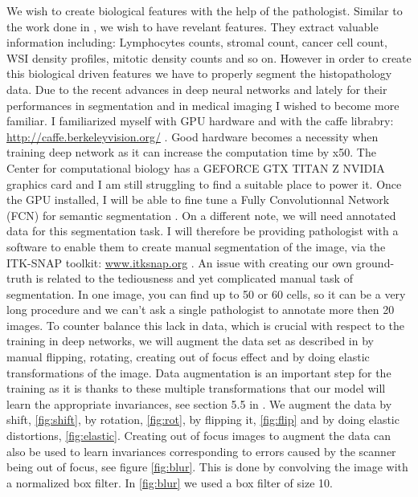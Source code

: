\documentclass[a4paper,10pt]{article}
\begin{document}
We wish to create biological features with the help of the pathologist. Similar to the work done in \citet{yuan2012quantitative}, we wish to have revelant features. They extract valuable information including: Lymphocytes counts, stromal count, cancer cell count, WSI density profiles, mitotic density counts and so on. However in order to create this biological driven features we have to properly segment the histopathology data. Due to the recent advances in deep neural networks and lately for their performances in segmentation and in medical imaging \citep{UNet,long2015fcn} I wished to become more familiar. I familiarized myself with GPU hardware and with the caffe librabry: \url{http://caffe.berkeleyvision.org/} \citep{jia2014caffe}. Good hardware becomes a necessity when training deep network as it can increase the computation time by x50. The Center for computational biology has a GEFORCE GTX TITAN Z NVIDIA graphics card and I am still struggling to find a suitable place to power it.
Once the GPU installed, I will be able to fine tune a Fully Convolutionnal Network (FCN) for semantic segmentation \citep{long2015fcn}. On a different note, we will need annotated data for this segmentation task. I will therefore be providing pathologist with a software to enable them to create manual segmentation of the image, via the ITK-SNAP toolkit: \url{www.itksnap.org} \citep{py06nimg}. An issue with creating our own ground-truth is related to the tediousness and yet complicated manual task of segmentation. In one image, you can find up to 50 or 60 cells, so it can be a very long procedure and we can't ask a single pathologist to annotate more then 20 images. To counter balance this lack in data, which is crucial with respect to the training in deep networks, we will augment the data set as described in \citet{UNet} by manual flipping, rotating, creating out of focus effect and by doing elastic transformations of the image. Data augmentation is an important step for the training as it is thanks to these multiple transformations that our model will learn the appropriate invariances,  see section 5.5 in \citep{bishop2006pattern}. We augment the data by shift, \ref{fig:shift}, by rotation, \ref{fig:rot}, by flipping it, \ref{fig:flip} and by doing elastic distortions, \ref{fig:elastic}. Creating out of focus images to augment the data can also be used to learn invariances corresponding to errors caused by the scanner being out of focus, see figure \ref{fig:blur}. This is done by convolving the image with a normalized box filter. In \ref{fig:blur} we used a box filter of size 10. 
\end{document}
